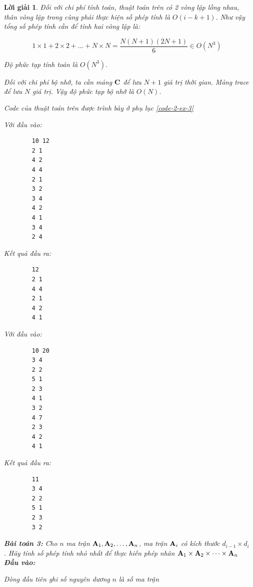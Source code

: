 \documentclass[14pt, a4paper]{article}
\theoremstyle{sltheorem}
\theoremstyle{soltheorem}
\newtheorem*{loigiai}{Lời giải}
\begin{document}
\begin{loigiai}
    Đối với chi phí tính toán, thuật toán trên có 2 vòng lặp lồng nhau, thân vòng lặp trong cùng phải thực hiện số phép tính là $O(i-k+1)$.
    Như vậy tổng số phép tính cần để tính hai vòng lặp là:

    \begin{equation*}
        1 \times 1 + 2 \times 2 + \dots + N \times N = \dfrac{N (N+1)(2N + 1)}{6} \in O(N^3)
    \end{equation*}

    Độ phức tạp tính toán là $O(N^3)$.

    Đối với chi phí bộ nhớ, ta cần mảng $\bold{C}$ để lưu $N+1$ giá trị thời gian. Mảng trace để lưu $N$ giá trị.
    Vậy độ phức tạp bộ nhớ là $O(N)$.

    Code của thuật toán trên được trình bày ở phụ lục \ref{code-2-ex-3}

    Với đầu vào:

    \begin{verbatim}
        10 12
        2 1    
        4 2
        4 4
        2 1
        3 2
        3 4
        4 2
        4 1
        3 4
        2 4
    \end{verbatim}

    Kết quả đầu ra:

    \begin{verbatim}
        12
        2 1
        4 4
        2 1
        4 2
        4 1
    \end{verbatim}

    Với đầu vào:

    \begin{verbatim}
        10 20
        3 4
        2 2
        5 1
        2 3 
        4 1
        3 2
        4 7
        2 3
        4 2
        4 1
    \end{verbatim}

    Kết quả đầu ra:

    \begin{verbatim}
        11
        3 4
        2 2
        5 1
        2 3
        3 2
    \end{verbatim}

    \textbf{Bài toán 3:} Cho $n$ ma trận $\bold{A}_1, \bold{A}_2, \dots, \bold{A}_n$, ma trận $\bold{A}_i$ có kích thước $d_{i-1} \times d_i$.
    Hãy tính số phép tính nhỏ nhất để thực hiễn phép nhân $\bold{A}_1 \times \bold{A}_2 \times \dots \times \bold{A}_n$
    \textbf{Đầu vào:}

    Dòng đầu tiên ghi số nguyên dương $n$ là số ma trận


\end{loigiai}
\end{document}
